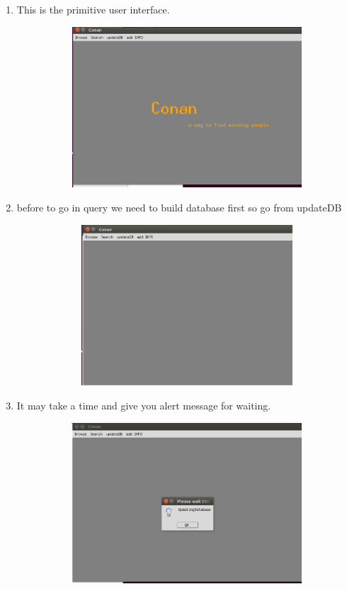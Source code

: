 \documentclass[pdftex,10pt,a4paper,oneside]{article}
\begin{document}
	\begin{enumerate}
		\item This is the primitive user interface.
			\begin{figure}[H]
			\centering
			\includegraphics[width=120mm,height=60mm]{fig/00.png}
		\end{figure}
		
	\pagebreak
	\item before to go in query we need to build database first so go from  updateDB
			
		\begin{figure}[H]
		\centering
		\includegraphics[width=120mm,height=60mm]{fig/01.png}
	\end{figure}
		\item 	It may take a time and give you alert message for waiting.
	\begin{figure}[H]
	\centering
	\includegraphics[width=120mm,height=60mm]{fig/2.png}
\end{figure}
	

\end{enumerate}
\end{document}
